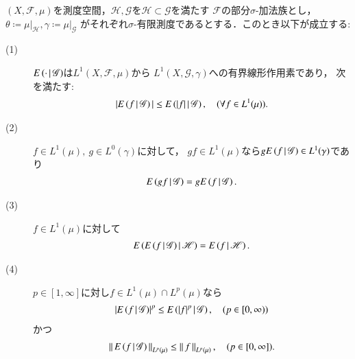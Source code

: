	\begin{screen}
		\begin{thm}[条件付き期待値の性質]\label{thm:properties_of_conditional_expectations}
			$(X,\mathscr{F},\mu)$を測度空間，$\mathscr{H},\mathscr{G}$を$\mathscr{H} \subset \mathscr{G}$を満たす
			$\mathscr{F}$の部分$\sigma$-加法族とし，$\theta \coloneqq \left. \mu \right|_{\mathscr{H}},
			\gamma \coloneqq \left. \mu \right|_{\mathscr{G}}$
			がそれぞれ$\sigma$-有限測度であるとする．このとき以下が成立する:
			\begin{description}
				\item[(1)] $E\left( \cdot \, \middle|\, \mathscr{G} \right)$は$L^1(X,\mathscr{F},\mu)$から
					$L^1\left(X,\mathscr{G},\gamma\right)$への有界線形作用素であり，
					次を満たす:
					\begin{align}
						|E\left( f \, \middle|\, \mathscr{G} \right)| \leq E\left( |f| \, \middle|\, \mathscr{G} \right),
						\quad (\forall f \in L^1(\mu)).
						\label{eq:thm_properties_of_conditional_expectations_2}
					\end{align}
				
				\item[(2)] $f \in L^1(\mu),\ g \in L^0(\gamma)$に対して，
					$gf \in L^1(\mu)$なら$g E\left( f \, \middle|\, \mathscr{G} \right) \in L^1(\gamma)$であり
					\begin{align}
						E\left( gf \, \middle|\, \mathscr{G} \right) = gE\left( f \, \middle|\, \mathscr{G} \right).
						\label{eq:thm_properties_of_conditional_expectations_4}
					\end{align}
					
				\item[(3)] $f \in L^1(\mu)$に対して
					\begin{align}
						E\left( E\left( f \, \middle|\, \mathscr{G} \right) \, \middle|\, \mathscr{H} \right) = E\left( f \, \middle|\, \mathscr{H} \right).
					\end{align}
					
				\item[(4)] $p \in [1,\infty]$に対し$f \in L^1(\mu) \cap L^p(\mu)$なら
					\begin{align}
						\left| E\left( f \, \middle|\, \mathscr{G} \right) \right|^p
						\leq E\left( |f|^p \, \middle|\, \mathscr{G} \right),\quad (p \in [0,\infty))
					\end{align}
					かつ
					\begin{align}
						\left\|\, E\left( f \, \middle|\, \mathscr{G} \right)\, \right\|_{L^p(\mu)}
						\leq \left\|\, f\, \right\|_{L^p(\mu)},\quad (p \in [0,\infty]).
						\label{eq:thm_properties_of_conditional_expectations_3}
					\end{align}
			\end{description}
		\end{thm}
	\end{screen}
	
